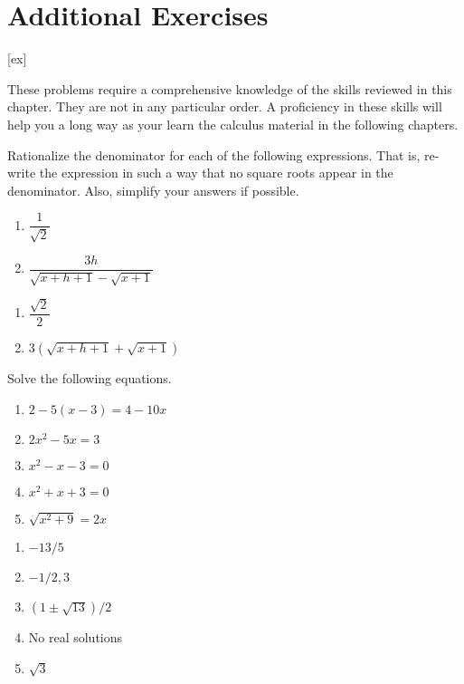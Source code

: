 \section{Additional Exercises}\label{sec:MoreReviewExercises}

[ex]

\begin{enumialphparenastyle}

These problems require a comprehensive knowledge of the skills reviewed in
this chapter. They are not in any particular order. A proficiency in these
skills will help you a long way as your learn the calculus material in the
following chapters.

\begin{multicols}{2}
\begin{ex}
Rationalize the denominator for each of the
following expressions. That is, re-write the expression in such a way that
no square roots appear in the denominator. Also, simplify your answers if
possible.
\begin{enumerate}
		\item	$\dfrac{1}{\sqrt{2}}$
	\item	$\dfrac{3h}{\sqrt{x+h+1}-\sqrt{x+1}}$
\end{enumerate}
\begin{sol}
\begin{enumerate}
	\item	$\dfrac{\sqrt{2}}{2}$
	\item	$3(\sqrt{x+h+1}+\sqrt{x+1})$
\end{enumerate}
\end{sol}
\end{ex}

\begin{ex}
Solve the following equations.
\begin{enumerate}
		\item	$2-5(x-3)=4-10x$
	\item	$2x^2-5x=3$
	\item	$x^2-x-3=0$
	\item	$x^2+x+3=0$
	\item	$\sqrt{x^2+9}=2x$
\end{enumerate}
\begin{sol}
\begin{enumerate}
	\item	$-13/5$
	\item	$-1/2,3$
	\item	$(1\pm\sqrt{13})/2$
	\item	No real solutions
	\item	$\sqrt{3}$
\end{enumerate}
\end{sol}
\end{ex}



\end{multicols}
\end{enumialphparenastyle}
